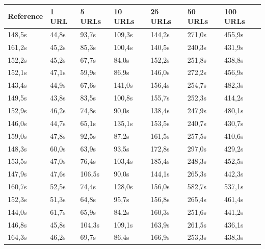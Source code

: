 \documentclass{scrartcl}
\begin{document}

\begin{table}[h]
\begin{tabular}{@{}lllllll@{}}
\toprule
Reference & 1 URL      & 5 URLs     & 10 URLs     & 25 URLs     & 50 URLs     & 100 URLs     \\ \midrule
148,5s    & 44,8s      & 93,7s      & 109,3s      & 144,2s      & 271,0s      & 455,9s       \\
161,2s    & 45,2s      & 85,3s      & 100,4s      & 140,5s      & 240,3s      & 431,9s       \\
152,2s    & 45,2s      & 67,7s      & 84,0s       & 152,2s      & 251,8s      & 438,8s       \\
152,1s    & 47,1s      & 59,9s      & 86,9s       & 146,0s      & 272,2s      & 456,9s       \\
143,4s    & 44,9s      & 67,6s      & 141,0s      & 156,4s      & 254,7s      & 482,3s       \\
149,5s    & 43,8s      & 83,5s      & 100,8s      & 155,7s      & 252,3s      & 414,2s       \\
152,9s    & 46,2s      & 74,8s      & 90,0s       & 138,4s      & 247,9s      & 480,1s       \\
146,0s    & 44,7s      & 65,1s      & 135,1s      & 153,5s      & 240,7s      & 430,7s       \\
159,0s    & 47,8s      & 92,5s      & 87,2s       & 161,5s      & 257,5s      & 410,6s       \\
148,3s    & 60,0s      & 63,9s      & 93,5s       & 172,8s      & 297,0s      & 429,2s       \\
153,5s    & 47,0s      & 76,4s      & 103,4s      & 185,4s      & 248,3s      & 452,5s       \\
147,9s    & 47,6s      & 106,5s     & 90,0s       & 144,1s      & 265,3s      & 442,3s       \\
160,7s    & 52,5s      & 74,4s      & 128,0s      & 156,0s      & 582,7s      & 537,1s       \\
152,3s    & 51,3s      & 64,8s      & 95,7s       & 156,8s      & 265,4s      & 461,4s       \\
144,0s    & 61,7s      & 65,9s      & 84,2s       & 160,3s      & 251,6s      & 441,2s       \\
146,8s    & 45,8s      & 104,3s     & 109,1s      & 163,9s      & 261,5s      & 436,1s       \\
164,3s    & 46,2s      & 69,7s      & 86,4s       & 166,9s      & 253,3s      & 438,3s       \\

\end{tabular}
\end{table}
\end{document}
